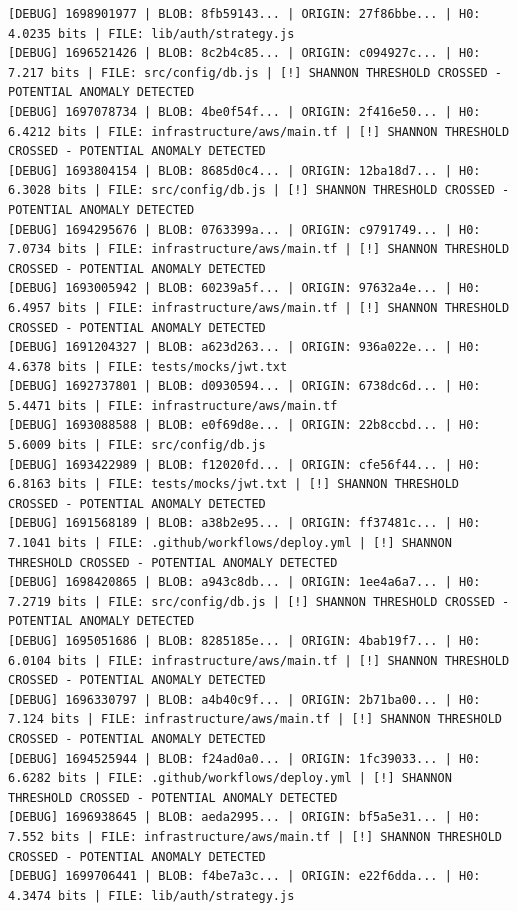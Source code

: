 \documentclass[12pt, a4paper, oneside]{report}
\begin{document}
\begin{lstlisting}[basicstyle=\tiny\ttfamily]
[DEBUG] 1698901977 | BLOB: 8fb59143... | ORIGIN: 27f86bbe... | H0: 4.0235 bits | FILE: lib/auth/strategy.js
[DEBUG] 1696521426 | BLOB: 8c2b4c85... | ORIGIN: c094927c... | H0: 7.217 bits | FILE: src/config/db.js | [!] SHANNON THRESHOLD CROSSED - POTENTIAL ANOMALY DETECTED
[DEBUG] 1697078734 | BLOB: 4be0f54f... | ORIGIN: 2f416e50... | H0: 6.4212 bits | FILE: infrastructure/aws/main.tf | [!] SHANNON THRESHOLD CROSSED - POTENTIAL ANOMALY DETECTED
[DEBUG] 1693804154 | BLOB: 8685d0c4... | ORIGIN: 12ba18d7... | H0: 6.3028 bits | FILE: src/config/db.js | [!] SHANNON THRESHOLD CROSSED - POTENTIAL ANOMALY DETECTED
[DEBUG] 1694295676 | BLOB: 0763399a... | ORIGIN: c9791749... | H0: 7.0734 bits | FILE: infrastructure/aws/main.tf | [!] SHANNON THRESHOLD CROSSED - POTENTIAL ANOMALY DETECTED
[DEBUG] 1693005942 | BLOB: 60239a5f... | ORIGIN: 97632a4e... | H0: 6.4957 bits | FILE: infrastructure/aws/main.tf | [!] SHANNON THRESHOLD CROSSED - POTENTIAL ANOMALY DETECTED
[DEBUG] 1691204327 | BLOB: a623d263... | ORIGIN: 936a022e... | H0: 4.6378 bits | FILE: tests/mocks/jwt.txt
[DEBUG] 1692737801 | BLOB: d0930594... | ORIGIN: 6738dc6d... | H0: 5.4471 bits | FILE: infrastructure/aws/main.tf
[DEBUG] 1693088588 | BLOB: e0f69d8e... | ORIGIN: 22b8ccbd... | H0: 5.6009 bits | FILE: src/config/db.js
[DEBUG] 1693422989 | BLOB: f12020fd... | ORIGIN: cfe56f44... | H0: 6.8163 bits | FILE: tests/mocks/jwt.txt | [!] SHANNON THRESHOLD CROSSED - POTENTIAL ANOMALY DETECTED
[DEBUG] 1691568189 | BLOB: a38b2e95... | ORIGIN: ff37481c... | H0: 7.1041 bits | FILE: .github/workflows/deploy.yml | [!] SHANNON THRESHOLD CROSSED - POTENTIAL ANOMALY DETECTED
[DEBUG] 1698420865 | BLOB: a943c8db... | ORIGIN: 1ee4a6a7... | H0: 7.2719 bits | FILE: src/config/db.js | [!] SHANNON THRESHOLD CROSSED - POTENTIAL ANOMALY DETECTED
[DEBUG] 1695051686 | BLOB: 8285185e... | ORIGIN: 4bab19f7... | H0: 6.0104 bits | FILE: infrastructure/aws/main.tf | [!] SHANNON THRESHOLD CROSSED - POTENTIAL ANOMALY DETECTED
[DEBUG] 1696330797 | BLOB: a4b40c9f... | ORIGIN: 2b71ba00... | H0: 7.124 bits | FILE: infrastructure/aws/main.tf | [!] SHANNON THRESHOLD CROSSED - POTENTIAL ANOMALY DETECTED
[DEBUG] 1694525944 | BLOB: f24ad0a0... | ORIGIN: 1fc39033... | H0: 6.6282 bits | FILE: .github/workflows/deploy.yml | [!] SHANNON THRESHOLD CROSSED - POTENTIAL ANOMALY DETECTED
[DEBUG] 1696938645 | BLOB: aeda2995... | ORIGIN: bf5a5e31... | H0: 7.552 bits | FILE: infrastructure/aws/main.tf | [!] SHANNON THRESHOLD CROSSED - POTENTIAL ANOMALY DETECTED
[DEBUG] 1699706441 | BLOB: f4be7a3c... | ORIGIN: e22f6dda... | H0: 4.3474 bits | FILE: lib/auth/strategy.js

\end{lstlisting}
\end{document}
